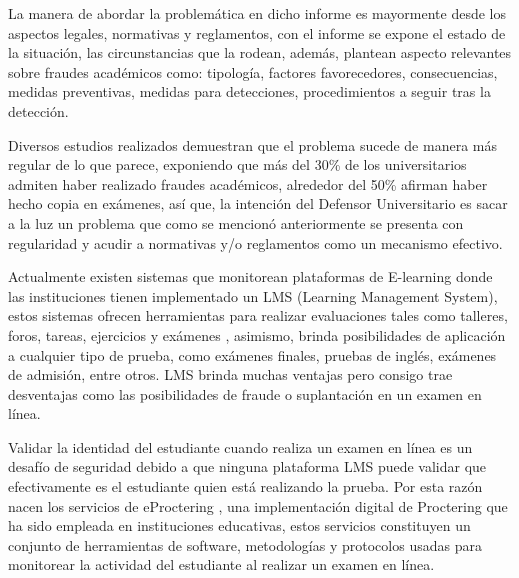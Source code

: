 \documentclass[../Main.tex]{subfiles}
\begin{document}
\begin{justify}
La manera de abordar la problemática en dicho informe es mayormente desde los aspectos legales, normativas y reglamentos, con el informe se expone el estado de la situación, las circunstancias que la rodean, además, plantean aspecto relevantes sobre fraudes académicos como: tipología, factores favorecedores, consecuencias, medidas preventivas, medidas para detecciones,  procedimientos a seguir tras la detección.
\end{justify}\par

\begin{justify}
Diversos estudios realizados demuestran que el problema sucede de manera más regular de lo que parece, exponiendo que más del 30\% de los universitarios admiten haber realizado fraudes académicos, alrededor del 50\% afirman haber hecho copia en exámenes, así que, la intención del Defensor Universitario es sacar a la luz un problema que como se mencionó anteriormente se presenta con regularidad y acudir a normativas y/o reglamentos como un mecanismo efectivo.
\end{justify}\par

\begin{justify}
Actualmente existen sistemas que monitorean plataformas de E-learning \cite{10} donde las instituciones tienen implementado un LMS (Learning Management System), estos sistemas ofrecen herramientas para realizar evaluaciones tales como talleres, foros, tareas, ejercicios y exámenes , asimismo, brinda posibilidades de aplicación a cualquier tipo de prueba, como exámenes finales, pruebas de inglés, exámenes de admisión, entre otros. LMS brinda muchas ventajas pero consigo trae desventajas como las posibilidades de fraude o suplantación en un examen en línea. 
\end{justify}\par

\begin{justify}
Validar la identidad del estudiante cuando realiza un examen en línea es un desafío de seguridad debido a que ninguna plataforma LMS puede validar que efectivamente es el estudiante quien está realizando la prueba. Por esta razón nacen los servicios de eProctering \cite{11}, una implementación digital de Proctering que ha sido empleada en instituciones educativas, estos servicios constituyen un conjunto de herramientas de software, metodologías y protocolos usadas para monitorear la actividad del estudiante al realizar un examen en línea.
\end{justify}\par
\end{document}
